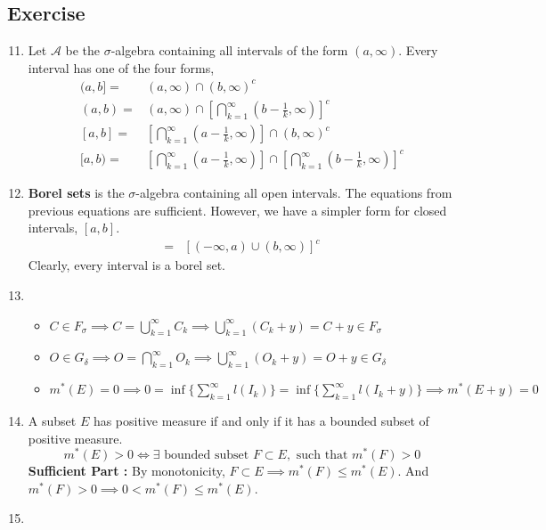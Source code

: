 \subsection{Exercise}
\begin{enumerate}
	\setcounter{enumi}{10}
	\item Let $\mathcal{A}$ be the $\sigma$-algebra containing all intervals of the form $(a, \infty)$. Every interval has one of the four forms,
	\begin{align}
		(a,b] = & (a,\infty) \cap (b,\infty)^c \\
		(a,b) = & (a,\infty) \cap \left[\bigcap_{k=1}^\infty \left(b-\frac{1}{k},\infty\right)\right]^c \\
		[a,b] = & \left[ \bigcap_{k=1}^\infty \left(a-\frac{1}{k},\infty\right)\right] \cap (b,\infty)^c \\
		[a,b) = & \left[\bigcap_{k=1}^\infty \left(a-\frac{1}{k},\infty\right)\right] \cap \left[ \bigcap_{k=1}^\infty \left(b-\frac{1}{k},\infty\right)\right]^c
	\end{align}
\item \textbf{Borel sets} is the $\sigma$-algebra containing all open intervals. The equations from previous equations are sufficient. However, we have a simpler form for closed intervals, $[a,b]$.
	\begin{align}
		[a,b] = & \left[(-\infty,a) \cup (b,\infty) \right]^c 
	\end{align}
		Clearly, every interval is a borel set.
	\item
	\begin{itemize}
		\item $C \in F_\sigma \implies C = \bigcup_{k=1}^\infty C_k \implies \bigcup_{k=1}^\infty \left(C_k+y\right) = C+y \in F_\sigma$
		\item $O \in G_\delta \implies O = \bigcap_{k=1}^\infty O_k \implies \bigcup_{k=1}^\infty \left( O_k+y \right) =  O+y \in G_\delta$
		\item $m^\ast(E) = 0 \implies 0 = \inf\{\sum_{k=1}^\infty l(I_k)\} = \inf\{\sum_{k=1}^\infty l(I_k+y)\} \implies  m^\ast(E+y) = 0$
	\end{itemize}
	\item A subset $E$ has positive measure if and only if it has a bounded subset of positive measure.
		$$m^\ast(E) > 0 \iff \exists \text{ bounded subset }F \subset E,\text{ such that } m^\ast(F) > 0$$
		\textbf{Sufficient Part :} By monotonicity, $F \subset E \implies m^\ast(F) \le m^\ast(E)$. And $m^\ast(F) > 0 \implies 0 < m^\ast(F) \le m^\ast(E)$.
	\item
\end{enumerate}

